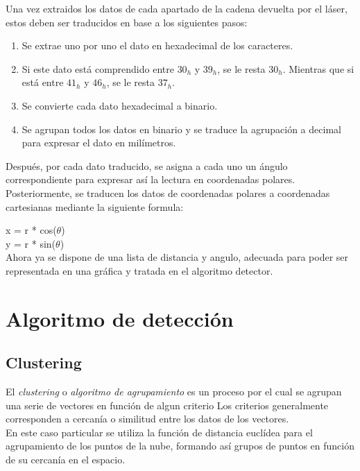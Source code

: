 	Una vez extraidos los datos de cada apartado de la cadena devuelta por el láser, estos deben ser traducidos en base a los 			siguientes pasos:
	\begin{enumerate}
		\item Se extrae uno por uno el dato en hexadecimal de los caracteres.
		\item Si este dato está comprendido entre $30_{h}$ y  $39_{h}$, se le resta  $30_{h}$. Mientras que si está entre  				$41_{h}$ y  $46_{h}$, se le resta $37_{h}$.
		\item Se convierte cada dato hexadecimal a binario.
		\item Se agrupan todos los datos en binario y se traduce la agrupación a decimal para expresar el dato en milímetros.
	\end{enumerate}
	
	Después, por cada dato traducido, se asigna a cada uno un ángulo correspondiente para expresar así la lectura en coordenadas		polares.\\
	Posteriormente, se traducen los datos de coordenadas polares a coordenadas cartesianas mediante la siguiente formula:

	x = r * cos(\(\theta\))\\
	y = r * sin(\(\theta\))\\

	Ahora ya se dispone de una lista de distancia y angulo, adecuada para poder ser representada en una gráfica y tratada en el algoritmo detector.\\


\section{Algoritmo de detección}

	\subsection{Clustering}
	El \emph{clustering} o \emph{algoritmo de agrupamiento} es un proceso por el cual se agrupan una serie de vectores en función de algun criterio %
Los criterios generalmente corresponden a cercanía o similitud entre los datos de los vectores.\\
En este caso particular se utiliza la función de distancia euclídea para el agrupamiento de los puntos de la nube, formando así grupos de puntos en función de su cercanía en el espacio.\\

